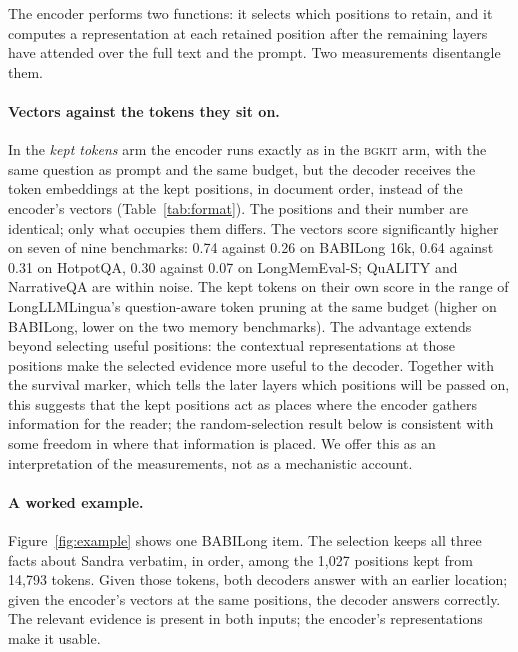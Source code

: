 \documentclass[11pt]{article}
\newcommand{\bgkit}{\textsc{bgkit}}
\begin{document}
The encoder performs two functions: it selects which positions to retain, and it computes a
representation at each retained position after the remaining layers have attended over the full text
and the prompt. Two measurements disentangle them.

\paragraph{Vectors against the tokens they sit on.}
In the \emph{kept tokens} arm the encoder runs exactly as in the \bgkit{} arm, with the same question
as prompt and the same budget, but the decoder receives the token embeddings at the kept positions,
in document order, instead of the encoder's vectors (Table~\ref{tab:format}). The positions and
their number are identical; only what occupies them differs. The vectors score significantly higher
on seven of nine benchmarks: 0.74 against 0.26 on BABILong 16k, 0.64 against 0.31 on HotpotQA, 0.30
against 0.07 on LongMemEval-S; QuALITY and NarrativeQA are within noise. The kept tokens on their
own score in the range of LongLLMLingua's question-aware token pruning at the same budget (higher on
BABILong, lower on the two memory benchmarks). The
advantage extends beyond selecting useful positions: the contextual representations at those
positions make the selected evidence more useful to the decoder. Together
with the survival marker, which tells the later layers which positions will be passed on, this
suggests that the kept positions act as places where the encoder gathers information for the reader;
the random-selection result below is consistent with some freedom in where that information is
placed. We offer this as an interpretation of the measurements, not as a mechanistic account.

\begin{table}[!ht]
\centering
\small
\resizebox{\linewidth}{!}{}
\caption{Same selection, different contents, at each benchmark's smallest budget. Vectors: the
\bgkit{} arm. Tokens: the token embeddings at the same kept positions (better of the two decoders).
Difference: vectors minus tokens, mean paired difference with 95\% bootstrap interval; bold where it
excludes zero. LongLLMLingua and text (truncated, trained decoder) at the same budget for scale.}
\label{tab:format}
\end{table}

\paragraph{A worked example.}
Figure~\ref{fig:example} shows one BABILong item. The selection keeps all three facts about Sandra
verbatim, in order, among the 1{,}027 positions kept from 14{,}793 tokens. Given those tokens, both
decoders answer with an earlier location; given the encoder's vectors at the same positions, the
decoder answers correctly. The relevant evidence is present in both inputs; the encoder's
representations make it usable.
\end{document}

